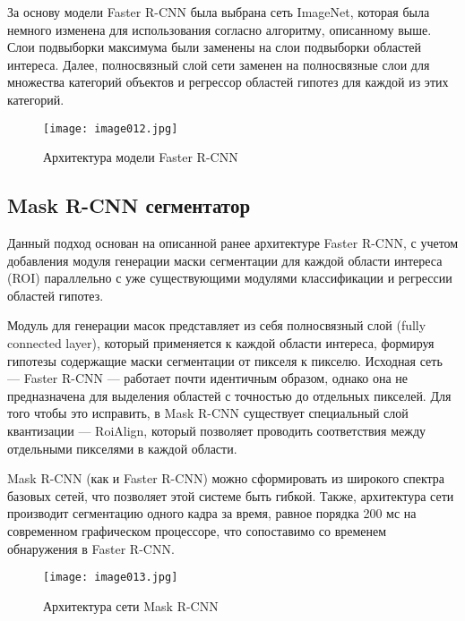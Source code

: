 За основу модели Faster R-CNN была выбрана сеть ImageNet, которая была немного изменена для использования согласно алгоритму, описанному выше. Слои подвыборки максимума были заменены на слои подвыборки областей интереса. Далее, полносвязный слой сети заменен на полносвязные слои для множества категорий объектов и регрессор областей гипотез для каждой из этих категорий.
\begin{figure}[htbp]
\centering
\texttt{[image: image012.jpg]}
\caption{Архитектура модели Faster R-CNN\cite{fifteen}}%
\label{fig:how-to-do-research}
\end{figure}

\subsection{Mask R-CNN сегментатор}

Данный подход основан на описанной ранее архитектуре Faster R-CNN, с учетом добавления модуля генерации маски сегментации для каждой области интереса (ROI) параллельно с уже существующими модулями классификации и регрессии областей гипотез. 

Модуль для генерации масок представляет из себя полносвязный слой (fully connected layer), который применяется к каждой области интереса, формируя гипотезы содержащие маски сегментации от пикселя к пикселю. Исходная сеть — Faster R-CNN — работает почти идентичным образом, однако она не предназначена для выделения областей с точностью до отдельных пикселей. Для того чтобы это исправить, в Mask R-CNN существует специальный слой квантизации — RoiAlign, который позволяет проводить соответствия между отдельными пикселями в каждой области.

Mask R-CNN (как и Faster R-CNN) можно сформировать из широкого спектра базовых сетей, что позволяет этой системе быть гибкой. Также, архитектура сети производит сегментацию одного кадра за время, равное порядка 200 мс на современном графическом процессоре, что сопоставимо со временем обнаружения в Faster R-CNN\cite{sixteen}.
\begin{figure}[htbp]
\centering
\texttt{[image: image013.jpg]}
\caption{Архитектура сети Mask R-CNN\cite{sixteen}}%
\label{fig:how-to-do-research}
\end{figure}

